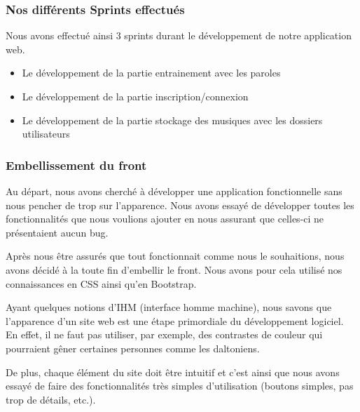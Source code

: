 \documentclass[12pt,french]{article}
\begin{document}
\subsubsection{Nos différents Sprints effectués}

Nous avons effectué ainsi 3 sprints durant le développement de notre application web.

\begin{itemize}
	\item Le développement de la partie entrainement avec les paroles
	\item Le développement de la partie inscription/connexion
	\item Le développement de la partie stockage des musiques avec les dossiers utilisateurs
\end{itemize}


\subsubsection{Embellissement du front}

Au départ, nous avons cherché à développer une application fonctionnelle sans nous pencher de trop sur l'apparence. Nous avons essayé de développer toutes les fonctionnalités que nous voulions ajouter en nous assurant que celles-ci ne présentaient aucun bug.

\medskip

Après nous être assurés que tout fonctionnait comme nous le souhaitions, nous avons décidé à la toute fin d'embellir le front. Nous avons pour cela utilisé nos connaissances en CSS ainsi qu'en Bootstrap.

\medskip

Ayant quelques notions d'IHM (interface homme machine), nous savons que l'apparence d'un site web est une étape primordiale du développement logiciel. En effet, il ne faut pas utiliser, par exemple, des contrastes de couleur qui pourraient gêner certaines personnes comme les daltoniens.

De plus, chaque élément du site doit être intuitif et c'est ainsi que nous avons essayé de faire des fonctionnalités très simples d'utilisation (boutons simples, pas trop de détails, etc.).
\end{document}
